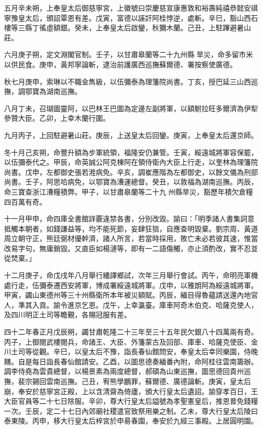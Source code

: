 \begin{pinyinscope}
五月辛未朔，上奉皇太后御慈寧宮，上徽號曰崇慶慈宣康惠敦和裕壽純禧恭懿安祺寧豫皇太后，頒詔覃恩有差。戊寅，富德以誣訐阿桂悖逆，處斬。辛巳，豁山西石樓等三縣丁徭虛額銀。癸未，上奉皇太后啟鑾，秋獮木蘭。己丑，上駐蹕避暑山莊。

六月庚子朔，定文淵閣官制。壬子，以甘肅皋蘭等二十九州縣旱災，命多留市米以供民食。庚申，黃邦寧論斬，逮治前護廣西巡撫蘇爾德、署按察使廣德。

秋七月庚申，索琳以不職金雋級，以伍彌泰為理籓院尚書。丁亥，授巴延三山西巡撫，調鄂寶為湖南巡撫。

八月丁未，召瑚圖靈阿，以巴林王巴圖為定邊左副將軍，以額駙拉旺多爾濟為伊犁參贊大臣。乙卯，上幸木蘭行圍。

九月丙子，上回駐避暑山莊。庚辰，上送皇太后回鑾。庚寅，上奉皇太后還京師。

冬十月己亥朔，命豐升額為步軍統領，福隆安仍兼管。壬寅，綏遠城將軍容保罷，以伍彌泰代之。甲辰，命英誠公阿克棟阿在領侍衛內大臣上行走，以奎林為理籓院尚書。戊申，左都御史張若溎病免。辛亥，調崔應階為左都御史，以餘文儀為刑部尚書。壬子，阿思哈病免，以鄂寶為漕運總督。癸丑，以敦福為湖南巡撫。丙辰，命三寶查浙江漕糧積弊。甲子，以甘肅皋蘭等二十九州縣旱災，豁歷年積欠倉糧四百萬有奇。

十一月甲申，命四庫全書館詳覈違禁各書，分別改毀。諭曰：「明季諸人書集詞意抵觸本朝者，如錢謙益等，均不能死節，妄肆狂狺，自應查明毀棄。劉宗周、黃道周立朝守正，熊廷弼材優幹濟，諸人所言，若當時採用，敗亡未必若彼其速，惟當改易字句，無庸銷毀。又直臣如楊漣等，即有一二語傷觸，亦止須酌改，實不忍並從焚棄。」

十二月庚子，命戊戌年八月舉行繙譯鄉試，次年三月舉行會試。丙午，命明亮軍機處行走，伍彌泰遷西安將軍，博成署綏遠城將軍。戊申，以雅朗阿為綏遠城將軍。甲寅，蠲山東德州等三十州縣衛所本年被災額賦。丙辰，緬目得魯蘊請送還內地官人，準其入貢。諭令進京乞恩。戊午，上幸瀛臺。庫車阿奇木伯克、哈薩克使人，及四川明正土司等瞻覲，各賜冠服有差。

四十二年春正月戊辰朔，蠲甘肅乾隆二十三年至三十五年民欠銀八十四萬兩有奇。丙子，上御閱武樓閱兵，命諸王、大臣、外籓蒙古及回部、庫車、哈薩克使臣、金川土司等從觀。辛巳，以皇太后不豫，詣長春仙館問安，奉皇太后幸同樂園，侍晚饍。自是每日詣長春仙館請安。乙酉，以圖思德奏緬番內附，命阿桂往雲南籌辦。調李侍堯為雲貴總督，以楊景素為兩度總督，郝碩為山東巡撫，圖思德回貴州巡撫，裴宗錫回雲南巡撫。己丑，宥熊學鵬罪，蘇爾德、廣德論斬。庚寅，皇太后崩，奉安於慈寧宮正殿，上以含清齋為倚廬，頒大行皇太后遺詔。諭穿孝百日，王大臣官員等二十七日除服。辛卯，尊大行皇太后謚號為孝聖憲皇后，推恩普免錢糧一次。壬辰，定二十七日內郊廟社稷遣官致祭用樂之制。乙未，尊大行皇太后陵曰泰東陵。丙申，移大行皇太后梓宮於申昜春園，奉安於九經三事殿。上居圓明園。


\end{pinyinscope}
